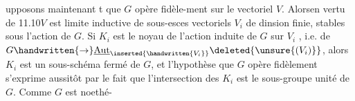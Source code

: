 upposons maintenant t que $G$ opère fidèle-\linebreak ment sur le vectoriel $V$. Alors\handwritten{,}en vertu de 11.10\handwritten{,}$V$ est limite inductive de sous-esces vectoriels $V_i$ de dinsion finie, stables sous l'action de $G$. Si $K_i$ est le noyau de l'action induite de $G$ sur $V_i$ , i.e. de $G\handwritten{\to}\underline{\operatorname{Aut}}_{\inserted{\handwritten{V_i}}}\deleted{\unsure{(V_i)}}$, alors $K_i$ est un sous-schéma fermé de $G$, et l'hypothèse que $G$ opère fidèlement s'exprime aussitôt par le fait que  l'intersection des $K_i$ est le sous-groupe unité de $G$. Comme $G$ est noethé-%
